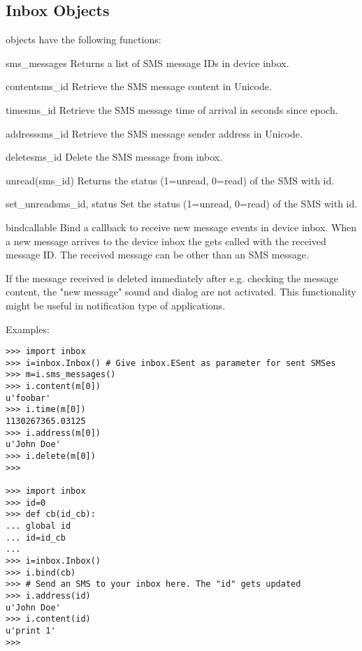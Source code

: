 \subsection{Inbox Objects}
\label{subsec:inbox}

 objects have the following functions:

\begin{methoddesc}[Inbox]{sms_messages}{}
Returns a list of SMS message IDs in device inbox.
\end{methoddesc}

\begin{methoddesc}[Inbox]{content}{sms_id}
Retrieve the SMS message content in Unicode. 
\end{methoddesc}

\begin{methoddesc}[Inbox]{time}{sms_id}
Retrieve the SMS message time of arrival in seconds since epoch. 
\end{methoddesc}

\begin{methoddesc}[Inbox]{address}{sms_id}
Retrieve the SMS message sender address in Unicode. 
\end{methoddesc}

\begin{methoddesc}[Inbox]{delete}{sms_id}
Delete the SMS message from inbox.
\end{methoddesc}

\begin{methoddesc}[Inbox]{unread}(sms_id)
Returns the status (1=unread, 0=read) of the SMS with id.
\end{methoddesc}

\begin{methoddesc}[inbox]{set_unread}{sms_id, status}
Set the status (1=unread, 0=read) of the SMS with id.
\end{methoddesc}

\begin{methoddesc}[Inbox]{bind}{callable}
Bind a callback to receive new message events in device inbox. When a new 
message arrives to the device inbox the  gets 
called with the received message ID. The received message can be other than 
an SMS message.

If the message received is deleted immediately after e.g. checking the message 
content, the "new message" sound and dialog are not activated. This 
functionality might be useful in notification type of applications. 
\end{methoddesc}

Examples:
\begin{verbatim}
>>> import inbox
>>> i=inbox.Inbox() # Give inbox.ESent as parameter for sent SMSes
>>> m=i.sms_messages()
>>> i.content(m[0])
u'foobar'
>>> i.time(m[0])
1130267365.03125
>>> i.address(m[0])
u'John Doe'
>>> i.delete(m[0])
>>>

>>> import inbox 
>>> id=0 
>>> def cb(id_cb): 
... global id 
... id=id_cb
... 
>>> i=inbox.Inbox()
>>> i.bind(cb)
>>> # Send an SMS to your inbox here. The "id" gets updated
>>> i.address(id)
u'John Doe'
>>> i.content(id)
u'print 1'
>>>
\end{verbatim}
